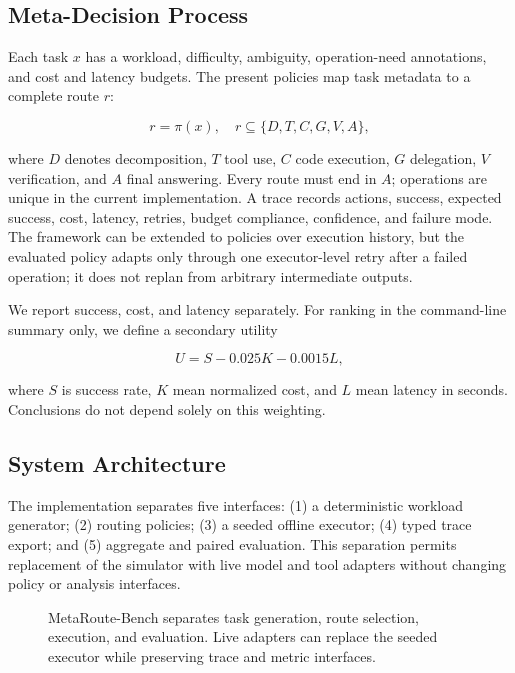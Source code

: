 \documentclass[sigconf]{acmart}
\begin{document}
\subsection{Meta-Decision Process}

Each task $x$ has a workload, difficulty, ambiguity, operation-need annotations, and cost and latency budgets. The present policies map task metadata to a complete route $r$:

\begin{equation}
r = \pi(x), \quad r \subseteq \{D,T,C,G,V,A\},
\end{equation}

where $D$ denotes decomposition, $T$ tool use, $C$ code execution, $G$ delegation, $V$ verification, and $A$ final answering. Every route must end in $A$; operations are unique in the current implementation. A trace records actions, success, expected success, cost, latency, retries, budget compliance, confidence, and failure mode. The framework can be extended to policies over execution history, but the evaluated policy adapts only through one executor-level retry after a failed operation; it does not replan from arbitrary intermediate outputs.

We report success, cost, and latency separately. For ranking in the command-line summary only, we define a secondary utility

\begin{equation}
U = S - 0.025K - 0.0015L,
\end{equation}

where $S$ is success rate, $K$ mean normalized cost, and $L$ mean latency in seconds. Conclusions do not depend solely on this weighting.

\subsection{System Architecture}

The implementation separates five interfaces: (1) a deterministic workload generator; (2) routing policies; (3) a seeded offline executor; (4) typed trace export; and (5) aggregate and paired evaluation. This separation permits replacement of the simulator with live model and tool adapters without changing policy or analysis interfaces.

\begin{figure}[t]
  \centering
  \caption{MetaRoute-Bench separates task generation, route selection, execution, and evaluation. Live adapters can replace the seeded executor while preserving trace and metric interfaces.}
  \label{fig:architecture}
\end{figure}
\end{document}
